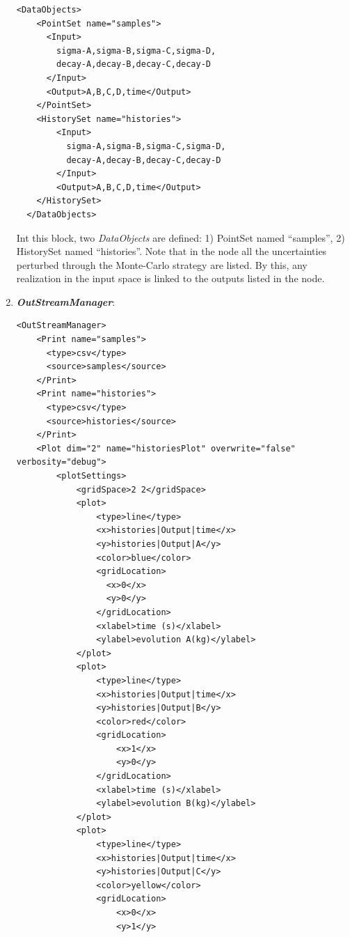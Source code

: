 \begin{enumerate}
\begin{lstlisting}[style=XML,morekeywords={arg,extension,pauseAtEnd,overwrite}]
  <DataObjects>
    <PointSet name="samples">
      <Input>
        sigma-A,sigma-B,sigma-C,sigma-D,
        decay-A,decay-B,decay-C,decay-D
      </Input>
      <Output>A,B,C,D,time</Output>
    </PointSet>
    <HistorySet name="histories">
        <Input>
          sigma-A,sigma-B,sigma-C,sigma-D,
          decay-A,decay-B,decay-C,decay-D
        </Input>
        <Output>A,B,C,D,time</Output>
    </HistorySet>
  </DataObjects>
\end{lstlisting}
  Int this block, two \textit{DataObjects} are defined: 1) PointSet named 
  ``samples'', 2) HistorySet named ``histories''.
  Note that in the  node all the uncertainties 
  perturbed through the Monte-Carlo strategy are listed. By this, any
  realization in the input space is linked to the outputs listed in the 
   node.
   \item \textbf{\textit{OutStreamManager}}:   
\begin{lstlisting}[style=XML,morekeywords={arg,extension,pauseAtEnd,overwrite}]
  <OutStreamManager>
    <Print name="samples">
      <type>csv</type>
      <source>samples</source>
    </Print>
    <Print name="histories">
      <type>csv</type>
      <source>histories</source>
    </Print>
    <Plot dim="2" name="historiesPlot" overwrite="false" verbosity="debug">
        <plotSettings>
            <gridSpace>2 2</gridSpace>
            <plot>
                <type>line</type>
                <x>histories|Output|time</x>
                <y>histories|Output|A</y>
                <color>blue</color>
                <gridLocation>
                  <x>0</x>
                  <y>0</y>
                </gridLocation>
                <xlabel>time (s)</xlabel>
                <ylabel>evolution A(kg)</ylabel>
            </plot>
            <plot>
                <type>line</type>
                <x>histories|Output|time</x>
                <y>histories|Output|B</y>
                <color>red</color>
                <gridLocation>
                    <x>1</x>
                    <y>0</y>
                </gridLocation>
                <xlabel>time (s)</xlabel>
                <ylabel>evolution B(kg)</ylabel>
            </plot>
            <plot>
                <type>line</type>
                <x>histories|Output|time</x>
                <y>histories|Output|C</y>
                <color>yellow</color>
                <gridLocation>
                    <x>0</x>
                    <y>1</y>

\end{lstlisting}
\end{enumerate}
